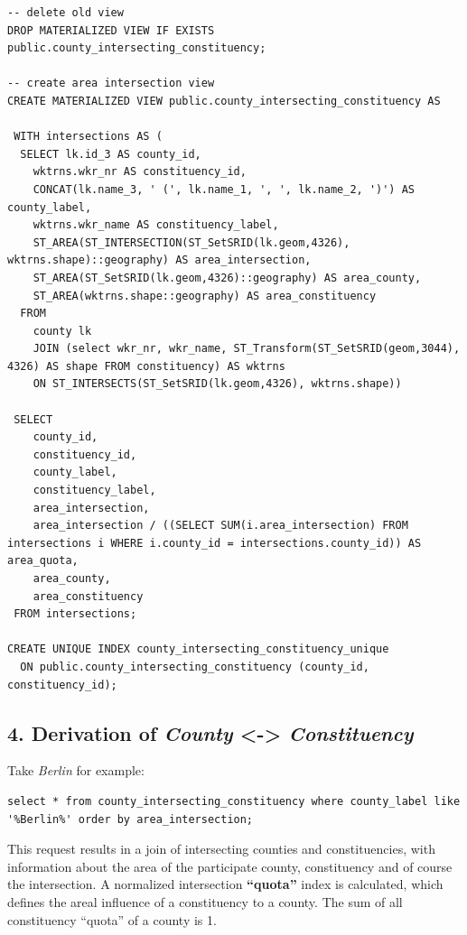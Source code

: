 \begin{lstlisting}
-- delete old view
DROP MATERIALIZED VIEW IF EXISTS public.county_intersecting_constituency;

-- create area intersection view
CREATE MATERIALIZED VIEW public.county_intersecting_constituency AS 

 WITH intersections AS (
  SELECT lk.id_3 AS county_id,
	wktrns.wkr_nr AS constituency_id,
	CONCAT(lk.name_3, ' (', lk.name_1, ', ', lk.name_2, ')') AS county_label,
	wktrns.wkr_name AS constituency_label,
	ST_AREA(ST_INTERSECTION(ST_SetSRID(lk.geom,4326), wktrns.shape)::geography) AS area_intersection,
	ST_AREA(ST_SetSRID(lk.geom,4326)::geography) AS area_county,
	ST_AREA(wktrns.shape::geography) AS area_constituency
  FROM
	county lk
	JOIN (select wkr_nr, wkr_name, ST_Transform(ST_SetSRID(geom,3044), 4326) AS shape FROM constituency) AS wktrns
	ON ST_INTERSECTS(ST_SetSRID(lk.geom,4326), wktrns.shape))
	
 SELECT
	county_id,
	constituency_id,
	county_label,
	constituency_label,
	area_intersection,
	area_intersection / ((SELECT SUM(i.area_intersection) FROM intersections i WHERE i.county_id = intersections.county_id)) AS area_quota,
	area_county,
	area_constituency
 FROM intersections;

CREATE UNIQUE INDEX county_intersecting_constituency_unique
  ON public.county_intersecting_constituency (county_id, constituency_id);
\end{lstlisting}

\subsection{4. Derivation of \emph{County} \textless{}-\textgreater{}
\emph{Constituency}}\label{derivation-of-county---constituency}

Take \emph{Berlin} for example:

\begin{lstlisting}
select * from county_intersecting_constituency where county_label like '%Berlin%' order by area_intersection;
\end{lstlisting}

This request results in a join of intersecting counties and
constituencies, with information about the area of the participate
county, constituency and of course the intersection. A normalized
intersection \textbf{``quota''} index is calculated, which defines the
areal influence of a constituency to a county. The sum of all
constituency ``quota'' of a county is 1.

